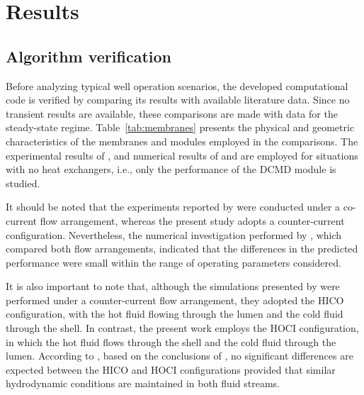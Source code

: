 \documentclass[14pt,letterpaper,fleqn]{extarticle}
\begin{document}
\section{Results}

\renewcommand{\topfraction}{0.90}
\renewcommand{\bottomfraction}{0.80}
\renewcommand{\textfraction}{0.10}
\renewcommand{\floatpagefraction}{0.88}
\setcounter{topnumber}{3}
\setcounter{bottomnumber}{2}
\setcounter{totalnumber}{4}

\subsection{Algorithm verification}
\label{subsec:algorithm-verification}

Before analyzing typical well operation scenarios, the developed computational code is
verified by comparing its results with available literature data. Since no transient
results are available, these comparisons are made with data for the steady-state regime.
Table~\ref{tab:membranes} presents the physical and geometric characteristics of the
membranes and modules employed in the comparisons. The experimental results of
\citet{Wang2008}, \citet{Yang2011} and numerical results of \citet{Guan2014} and
\citet{Kim2014} are employed for situations with no heat exchangers, i.e., only the
performance of the DCMD module is studied.

It should be noted that the experiments reported by \citet{Wang2008} were conducted under 
a co-current flow arrangement, whereas the present study adopts a counter-current configuration. 
Nevertheless, the numerical investigation performed by \citet{Kim2014}, which compared both flow 
arrangements, indicated that the differences in the predicted performance were small within the 
range of operating parameters considered.

It is also important to note that, although the simulations presented by \citet{Guan2014} were performed
under a counter-current flow arrangement, they adopted the HICO configuration, with the hot fluid flowing
through the lumen and the cold fluid through the shell. In contrast, the present work employs the HOCI
configuration, in which the hot fluid flows through the shell and the cold fluid through the lumen. 
According to \citet{Guan2012,Guan2014}, based on the conclusions of \citet{Wirth2002}, no significant 
differences are expected between the HICO and HOCI configurations provided that similar hydrodynamic 
conditions are maintained in both fluid streams.
\end{document}
